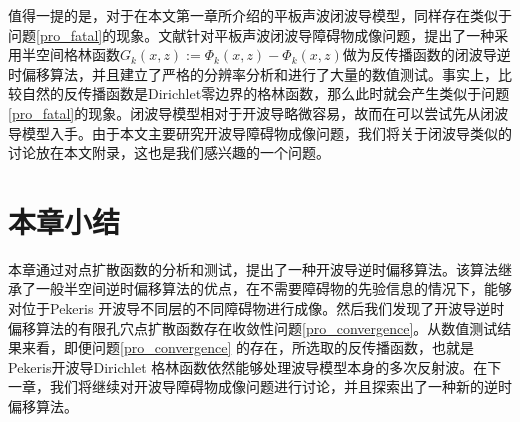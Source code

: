 \begin{remark}
	值得一提的是，对于在本文第一章所介绍的平板声波闭波导模型，同样存在类似于问题\ref{pro_fatal}的现象。文献\cite{ch_cw}针对平板声波闭波导障碍物成像问题，提出了一种采用半空间格林函数$G_k(x,z):=\Phi_k(x,z)-\Phi_{k}(x,z)$做为反传播函数的闭波导逆时偏移算法，并且建立了严格的分辨率分析和进行了大量的数值测试。事实上，比较自然的反传播函数是Dirichlet零边界的格林函数，那么此时就会产生类似于问题\ref{pro_fatal}的现象。闭波导模型相对于开波导略微容易，故而在可以尝试先从闭波导模型入手。由于本文主要研究开波导障碍物成像问题，我们将关于闭波导类似的讨论放在本文附录，这也是我们感兴趣的一个问题。
\end{remark}
\section{本章小结}
本章通过对点扩散函数的分析和测试，提出了一种开波导逆时偏移算法。该算法继承了一般半空间逆时偏移算法的优点，在不需要障碍物的先验信息的情况下，能够对位于Pekeris 开波导不同层的不同障碍物进行成像。然后我们发现了开波导逆时偏移算法的有限孔穴点扩散函数存在收敛性问题\ref{pro_convergence}。从数值测试结果来看，即便问题\ref{pro_convergence} 的存在，所选取的反传播函数，也就是Pekeris开波导Dirichlet 格林函数依然能够处理波导模型本身的多次反射波。在下一章，我们将继续对开波导障碍物成像问题进行讨论，并且探索出了一种新的逆时偏移算法。


